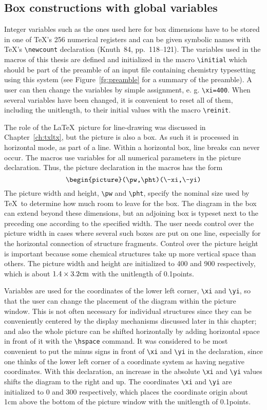 \subsection{Box constructions with global variables}
 Integer variables such as the ones used here for box dimensions
 have to be stored in one of \TeX's 256 numerical registers and can
 be given symbolic names with \TeX's \verb+\newcount+ declaration
 (Knuth~84, pp.~118--121). The variables used in the macros of
 this thesis are defined and initialized in the macro
 \verb+\initial+ which should be part of the preamble of an input
 file containing chemistry typesetting using this system (see
 Figure~\ref{fg:preamble}
 for a summary of the preamble). A user can then change the
 variables by simple assignment, e. g. \verb+\xi=400+.
 When several variables have been changed, it is convenient to
 reset all of them, including the unitlength, to their initial
 values with the macro \verb+\reinit+.
 
 The role of the \LaTeX\  picture for line-drawing was discussed
 in Chapter~\ref{ch:txltx},
 but the picture is also a box.
 As such it is processed in horizontal mode, as part of a line.
 Within a horizontal box, line breaks can never occur.
 The macros use variables for all numerical
 parameters in the picture declaration.
 Thus, the picture declaration in the macros has the form \\
 $$\hbox{\verb+\begin{picture}(\pw,\pht)(\-xi,\-yi)+}$$
 The picture width and height, \verb+\pw+ and \verb+\pht+,
 specify the nominal size used by \TeX\  to determine how much
 room to leave for the box. The diagram in the box can extend
 beyond these dimensions, but an adjoining box is typeset next
 to the preceding one according to the specified width.
 The user needs control over the picture width in cases where
 several such boxes are put on one line, especially for the
 horizontal connection of structure fragments.
  Control over the picture height is important because
 some chemical structures take up more vertical space than
 others. The picture width and height are initialized to 400
 and 900 respectively, which is about $1.4\times 3.2\hbox{cm}$ with
 the unitlength of 0.1points.
 
 Variables are used for the coordinates of the
 lower left corner, \verb+\xi+ and \verb+\yi+, so that the
 user can change the placement of the diagram within the
 picture window. This is not often necessary for individual
 structures since they can be conveniently centered by
 the display mechanisms discussed later in this chapter;
 and also the whole picture can be shifted horizontally by
 adding horizontal space in front of it with the
 \verb+\hspace+ command.
 It was considered to be most convenient to put the minus
 signs in front of \verb+\xi+ and \verb+\yi+ in the declaration,
 since one thinks of the lower left corner of a coordinate
 system as having negative coordinates. With this declaration,
 an increase in the absolute \verb+\xi+ and \verb+\yi+ values
 shifts the diagram to the right and up. The coordinates
 \verb+\xi+ and \verb+\yi+ are initialized to 0 and 300
 respectively, which places the coordinate origin about 1cm
 above the bottom of the picture window with the unitlength
 of 0.1points.
 
